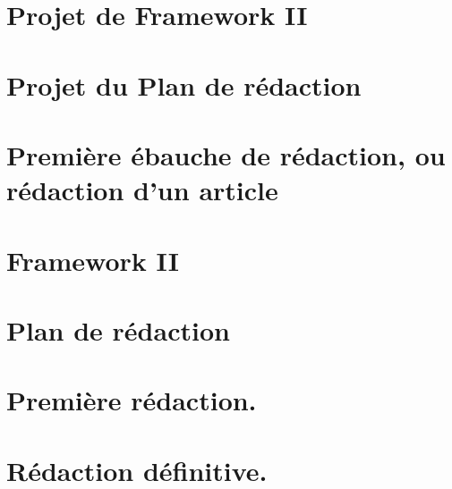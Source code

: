 \documentclass[paper=A4,portrait,twoside=true,twocolumn=false,headinclude=false,footinclude=false,fontsize=11,BCOR=15mm,DIV=calc,pagesize=auto,titlepage=firstiscover,mpinclude=true,headings=normal,headings=twolinechapter,open=right,chapterprefix=false,headsepline=false,parskip=full]{scrbook}
\begin{document}
\chapter{Projet de Framework II}
\label{sec:orgaacb5e1}
\chapter{Projet du Plan de rédaction}
\label{sec:org8bc7b25}
\chapter{Première ébauche de rédaction, ou rédaction d'un article}
\label{sec:orga7eb468}
\chapter{Framework II}
\label{sec:orge22f34d}
\chapter{Plan de rédaction}
\label{sec:org954b6ef}
\chapter{Première rédaction.}
\label{sec:orgaf447a6}
\chapter{Rédaction définitive.}
\label{sec:org72a2aa0}
\end{document}
